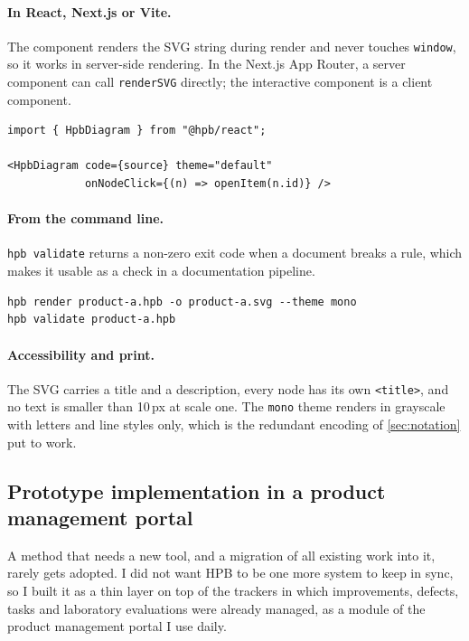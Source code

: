 \paragraph{In React, Next.js or Vite.}
The component renders the SVG string during render and never touches
\texttt{window}, so it works in server-side rendering. In the Next.js App
Router, a server component can call \texttt{renderSVG} directly; the
interactive component is a client component.
\begin{lstlisting}[language=hpbplain]
import { HpbDiagram } from "@hpb/react";

<HpbDiagram code={source} theme="default"
            onNodeClick={(n) => openItem(n.id)} />
\end{lstlisting}

\paragraph{From the command line.}
\texttt{hpb validate} returns a non-zero exit code when a document breaks
a rule, which makes it usable as a check in a documentation pipeline.
\begin{lstlisting}[language=hpbplain]
hpb render product-a.hpb -o product-a.svg --theme mono
hpb validate product-a.hpb
\end{lstlisting}

\paragraph{Accessibility and print.}
The SVG carries a title and a description, every node has its own
\texttt{<title>}, and no text is smaller than 10\,px at scale one. The
\texttt{mono} theme renders in grayscale with letters and line styles only,
which is the redundant encoding of \cref{sec:notation} put to work.

\subsection{Prototype implementation in a product management portal}
\label{sec:implementation}

A method that needs a new tool, and a migration of all existing work into
it, rarely gets adopted. I did not want HPB to be one more system to keep
in sync, so I built it as a thin layer on top of the trackers in which
improvements, defects, tasks and laboratory evaluations were already
managed, as a module of the product management portal I use daily.

